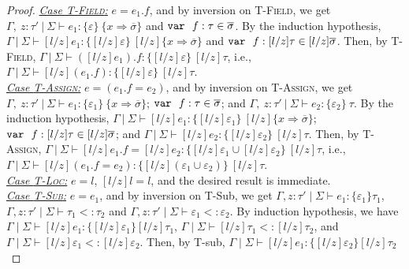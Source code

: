 \begin{proof}
\noindent\underline{\textit{Case \textsc{T-Field}:}} $e = e_1.f$, and by inversion on \textsc{T-Field}, we get $\Gamma,~z : \tau'~|~\Sigma \vdash e_1 : \{ \varepsilon \}~\{ x \Rightarrow \overline{\sigma} \}$ and \mbox{$\mathtt{var}~~ f : \tau \in \overline{\sigma}$}. By the induction hypothesis, $\Gamma~|~\Sigma \vdash [l/z]e_1 : \{ [l/z]\varepsilon \}~[l/z]\{ x \Rightarrow \overline{\sigma} \}$ and \mbox{$\mathtt{var}~~ f : [l/z]\tau \in [l/z]\overline{\sigma}$}. Then, by \textsc{T-Field}, $\Gamma~|~\Sigma \vdash ([l/z]e_1).f : \{ [l/z]\varepsilon \}~[l/z]\tau$, i.e., $\Gamma~|~\Sigma \vdash [l/z](e_1.f) : \{ [l/z]\varepsilon \}~[l/z]\tau$.\\

\noindent\underline{\textit{Case \textsc{T-Assign}:}} \mbox{$e = (e_1.f = e_2)$}, and by inversion on \textsc{T-Assign}, we get
\mbox{$\Gamma,~z : \tau'~|~\Sigma \vdash e_1 : \{ \varepsilon_1 \}~\{ x \Rightarrow \overline{\sigma} \}$}; $\mathtt{var}~~ f : \tau \in \overline{\sigma}$; and \mbox{$\Gamma,~z : \tau'~|~\Sigma \vdash e_2 : \{ \varepsilon_2 \}~\tau$}. By the induction hypothesis,  \mbox{$\Gamma~|~\Sigma \vdash [l/z]e_1 : \{ [l/z]\varepsilon_1 \}~[l/z]\{ x \Rightarrow \overline{\sigma} \}$}; \mbox{$\mathtt{var}~~ f : [l/z]\tau \in [l/z]\overline{\sigma}$};  and \mbox{$\Gamma~|~\Sigma \vdash [l/z]e_2 : \{ [l/z]\varepsilon_2 \}~[l/z]\tau$}. Then, by \textsc{T-Assign}, 
\mbox{$\Gamma~|~\Sigma \vdash [l/z]e_1.f = [l/z]e_2 : \{ [l/z]\varepsilon_1 \cup [l/z]\varepsilon_2\}~[l/z]\tau$}, i.e.,
\mbox{$\Gamma~|~\Sigma \vdash [l/z](e_1.f=e_2) : \{ [l/z](\varepsilon_1 \cup \varepsilon_2) \}~[l/z]\tau$}.\\

\noindent\underline{\textit{Case \textsc{T-Loc}:}} $e = l$, $[l/z]l = l$, and the desired result is immediate.\\

\noindent\underline{\textit{Case \textsc{T-Sub}:}} $e = e_1$, and by inversion on T-Sub, we get $\Gamma, z:\tau' \mid \Sigma \vdash e_1:\{\varepsilon_1\} \tau_1$, $\Gamma, z:\tau' \mid \Sigma \vdash \tau_1 <: \tau_2$ and $\Gamma, z:\tau' \mid \Sigma \vdash \varepsilon_1 <: \varepsilon_2$.
    By induction hypothesis, we have
    \mbox{$\Gamma \mid \Sigma \vdash [l/z]e_1:\{[l/z]\varepsilon_1\} [l/z]\tau_1$}, \mbox{$\Gamma \mid \Sigma \vdash [l/z]\tau_1 <: [l/z]\tau_2$}, and \mbox{$\Gamma \mid \Sigma \vdash [l/z]\varepsilon_1 <: [l/z]\varepsilon_2$}.
    Then, by T-sub,
    \mbox{$\Gamma \mid \Sigma \vdash [l/z]e_1 : \{[l/z]\varepsilon_2\}[l/z]\tau_2$}


\end{proof}
